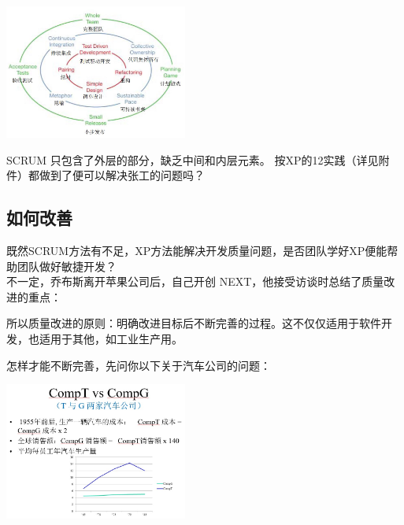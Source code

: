 
\includegraphics[width=6cm]{cleanagile_f18.jpg}

SCRUM 只包含了外层的部分，缺乏中间和内层元素。
按XP的12实践（详见附件）都做到了便可以解决张工的问题吗？\\

\hypertarget{ux5982ux4f55ux6539ux5584}{%
\subsection{如何改善}\label{ux5982ux4f55ux6539ux5584}}

既然SCRUM方法有不足，XP方法能解决开发质量问题，是否团队学好XP便能帮助团队做好敏捷开发？\\
不一定，乔布斯离开苹果公司后，自己开创
NEXT，他接受访谈时总结了质量改进的重点：


所以质量改进的原则：明确改进目标后不断完善的过程。这不仅仅适用于软件开发，也适用于其他，如工业生产用。

怎样才能不断完善，先问你以下关于汽车公司的问题：


\includegraphics[width=6cm]{TvsGcompScreenshot_2023-06-07_121806.jpg}


